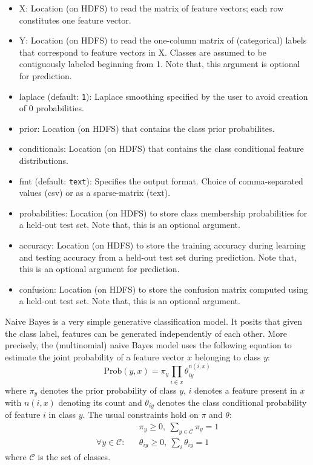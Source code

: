 
\begin{itemize}
\item X: Location (on HDFS) to read the matrix of feature vectors; 
each row constitutes one feature vector.
\item Y: Location (on HDFS) to read the one-column matrix of (categorical) 
labels that correspond to feature vectors in X. Classes are assumed to be
contiguously labeled beginning from 1. Note that, this argument is optional
for prediction.
\item laplace (default: {\tt 1}): Laplace smoothing specified by the 
user to avoid creation of 0 probabilities.
\item prior: Location (on HDFS) that contains the class prior probabilites.
\item conditionals: Location (on HDFS) that contains the class conditional
feature distributions.
\item fmt (default: {\tt text}): Specifies the output format. Choice of 
comma-separated values (csv) or as a sparse-matrix (text).
\item probabilities: Location (on HDFS) to store class membership probabilities
for a held-out test set. Note that, this is an optional argument.
\item accuracy: Location (on HDFS) to store the training accuracy during
learning and testing accuracy from a held-out test set during prediction. 
Note that, this is an optional argument for prediction.
\item confusion: Location (on HDFS) to store the confusion matrix
computed using a held-out test set. Note that, this is an optional 
argument.
\end{itemize}


Naive Bayes is a very simple generative classification model. It posits that 
given the class label, features can be generated independently of each other.
More precisely, the (multinomial) naive Bayes model uses the following 
equation to estimate the joint probability of a feature vector $x$ belonging 
to class $y$:
\begin{equation*}
\text{Prob}(y, x) = \pi_y \prod_{i \in x} \theta_{iy}^{n(i,x)}
\end{equation*}
where $\pi_y$ denotes the prior probability of class $y$, $i$ denotes a feature
present in $x$ with $n(i,x)$ denoting its count and $\theta_{iy}$ denotes the 
class conditional probability of feature $i$ in class $y$. The usual 
constraints hold on $\pi$ and $\theta$:
\begin{eqnarray*}
&& \pi_y \geq 0, ~ \sum_{y \in \mathcal{C}} \pi_y = 1\\
\forall y \in \mathcal{C}: && \theta_{iy} \geq 0, ~ \sum_i \theta_{iy} = 1
\end{eqnarray*}
where $\mathcal{C}$ is the set of classes.

